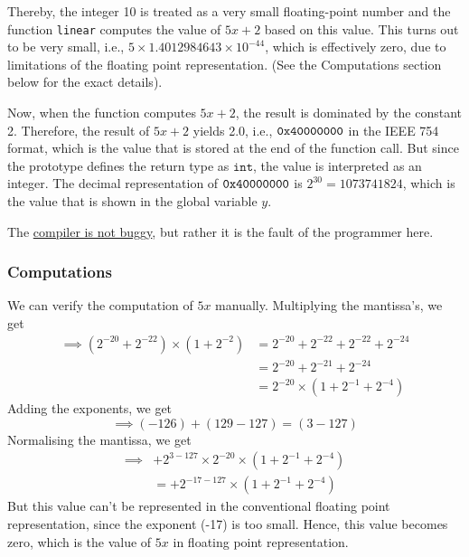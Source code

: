 Thereby, the integer 10 is treated as a very small floating-point number and the function \texttt{linear} computes the value of \( 5x + 2 \) based on this value.
This turns out to be very small, i.e., \( 5 \times 1.4012984643 \times 10^{-44} \), which is effectively zero, due to limitations of the floating point representation.
(See the Computations section below for the exact details).

Now, when the function computes \( 5x + 2\), the result is dominated by the constant 2.
Therefore, the result of \( 5x + 2\) yields 2.0, i.e., \( \texttt{0x40000000} \) in the IEEE 754 format, which is the value that is stored at the end of the function call.
But since the prototype defines the return type as \( \texttt{int} \), the value is interpreted as an integer.
The decimal representation of \( \texttt{0x40000000} \) is \( 2^{30} = \boxed{1073741824} \), which is the value that is shown in the global variable \( y \).

The \underline{compiler is not buggy}, but rather it is the fault of the programmer here.

\subsubsection*{Computations}

We can verify the computation of \( 5x \) manually.
Multiplying the mantissa's, we get
\begin{align*}
    \implies
    (2^{-20} + 2^{-22}) \times (1 + 2^{-2})
     & =
    2^{-20} + 2^{-22} + 2^{-22} + 2^{-24}
    \\ & =
    2^{-20} + 2^{-21}+ 2^{-24}
    \\ & =
    2^{-20} \times (1 + 2^{-1}+ 2^{-4})
\end{align*}
Adding the exponents, we get
\[
    \implies
    (-126) + (129 - 127)
    =
    (3 - 127)
\]
Normalising the mantissa, we get
\begin{align*}
    \implies
     &
    + 2^{3 - 127} \times 2^{-20} \times (1 + 2^{-1}+ 2^{-4})
    \\ & =
    + 2^{-17 - 127} \times (1 + 2^{-1}+ 2^{-4})
\end{align*}
But this value can't be represented in the conventional floating point representation, since the exponent (-17) is too small.
Hence, this value becomes zero, which is the value of \( 5x \) in floating point representation.
